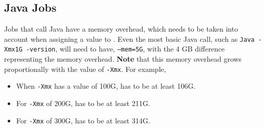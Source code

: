 \subsection{Java Jobs}
\label{sect:java}

Jobs that call Java have a memory overhead, which needs to be taken
into account when assigning a value to . Even the most basic
Java call, such as \texttt{Java -Xmx1G -version}, will need to have,
\texttt{--mem=5G}, with the 4 GB difference representing the memory overhead.
\textbf{Note} that this memory overhead grows proportionally with the value of
\texttt{-Xmx}. For example,

\begin{itemize}
  \item When \texttt{-Xmx} has a value of 100G,  has to be at least 106G.
  \item For \texttt{-Xmx} of 200G,  has to be at least 211G.
  \item For \texttt{-Xmx} of 300G,  has to be at least 314G.
\end{itemize}

